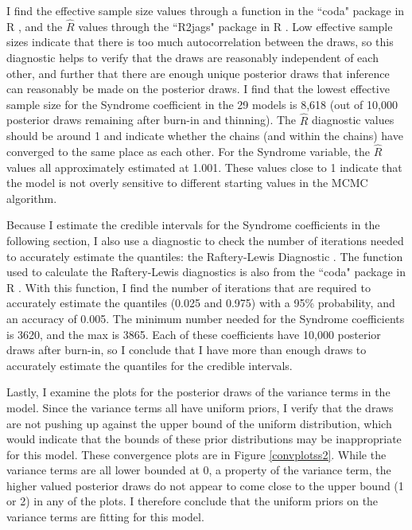 I find the effective sample size values through a function in the ``coda" package in R \citep{coda}, and the $\hat{R}$ values through the ``R2jags" package in R \citep{r2jags}. Low effective sample sizes indicate that there is too much autocorrelation between the draws, so this diagnostic helps to verify that the draws are reasonably independent of each other, and further that there are enough unique posterior draws that inference can reasonably be made on the posterior draws. I find that the lowest effective sample size for the Syndrome coefficient in the 29 models is 8,618 (out of 10,000 posterior draws remaining after burn-in and thinning). The $\hat{R}$ diagnostic values should be around 1 and indicate whether the chains (and within the chains) have converged to the same place as each other. For the Syndrome variable, the $\hat{R}$ values all approximately estimated at 1.001. These values close to 1 indicate that the model is not overly sensitive to different starting values in the MCMC algorithm. 

Because I estimate the credible intervals for the Syndrome coefficients in the following section, I also use a diagnostic to check the number of iterations needed to accurately estimate the quantiles: the Raftery-Lewis Diagnostic \citep{rafterylewis}. The function used to calculate the Raftery-Lewis diagnostics is also from the ``coda" package in R \citep{coda}. With this function, I find the number of iterations that are required to accurately estimate the quantiles (0.025 and 0.975) with a 95\% probability, and an accuracy of 0.005. The minimum number needed for the Syndrome coefficients is 3620, and the max is 3865. Each of these coefficients have 10,000 posterior draws after burn-in, so I conclude that I have more than enough draws to accurately estimate the quantiles for the credible intervals. 

Lastly, I examine the plots for the posterior draws of the variance terms in the model. Since the variance terms all have uniform priors, I verify that the draws are not pushing up against the upper bound of the uniform distribution, which would indicate that the bounds of these prior distributions may be inappropriate for this model. These convergence plots are in Figure \ref{convplotss2}. While the variance terms are all lower bounded at 0, a property of the variance term, the higher valued posterior draws do not appear to come close to the upper bound (1 or 2) in any of the plots. I therefore conclude that the uniform priors on the variance terms are fitting for this model.

